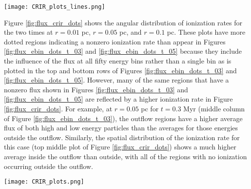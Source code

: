 \documentclass[twocolumn]{aastex63}
\begin{document}
\begin{figure*}
\centering
\texttt{[image: CRIR\_plots\_lines.png]}
\caption{Ionization rate as a function of radius for $t=0.3$ Myr and $t=0.5$ Myr. Blue lines show the average over all angular bins computed at a given radius, and the averages for $F_t>0.01$, $F_t>0.05$, and $F_t>0.1$ are shown in yellow, brown, and red respectively. Maximum values of any angular bin at a given radius are shown by the green points. The gray line indicates $\zeta=10^{-16} \rm s^{-1}$, which is the measured ionization rate for the Milky Way.}
\label{fig:crir}
\end{figure*}

Figure \ref{fig:flux_crir_dots} shows the angular distribution of ionization rates for the two times at $r=0.01$ pc, $r=0.05$ pc, and $r=0.1$ pc. These plots have more dotted regions indicating a nonzero ionization rate than appear in Figures \ref{fig:flux_ebin_dots_t_03} and \ref{fig:flux_ebin_dots_t_05} because they include the influence of the flux at all fifty energy bins rather than a single bin as is plotted in the top and bottom rows of Figures \ref{fig:flux_ebin_dots_t_03} and \ref{fig:flux_ebin_dots_t_05}. However, many of the same regions that have a nonzero flux shown in Figures \ref{fig:flux_ebin_dots_t_03} and \ref{fig:flux_ebin_dots_t_05} are reflected by a higher ionization rate in Figure \ref{fig:flux_crir_dots}. For example, at $r=0.05$ pc for $t=0.3$ Myr (middle column of Figure \ref{fig:flux_ebin_dots_t_03}), the outflow regions have a higher average flux of both high and low energy particles than the averages for those energies outside the outflow. Similarly, the spatial distribution of the ionization rate for this case (top middle plot of Figure \ref{fig:flux_crir_dots}) shows a much higher average inside the outflow than outside, with all of the regions with no ionization occurring outside the outflow.

\begin{figure*}
\centering
\texttt{[image: CRIR\_plots.png]}
\caption{Ionization rate for $t=0.3$ Myr (top) and $t=0.5$ Myr (bottom) computed in different regions of the grid at $r=0.01$ pc, $r=0.05$ pc, and $r=0.1$ pc. The magnitude of the ionization rate is indicated by the size and color of the dots which each represent a range of values, with larger darker colored dots indicating a higher ionization rate. Regions without any dots have no ionization. Colorscale indicates the tracer fraction.}
\label{fig:flux_crir_dots}
\end{figure*}
\end{document}

